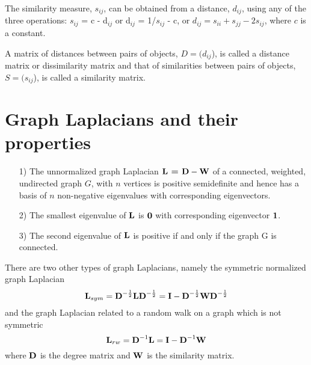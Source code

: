 The similarity measure, $s_{ij}$, can be obtained from a distance, $d_{ij}$, using any of the three operations: $s_{ij}$ = c - d$_{ij}$ or  d$_{ij}$ = 1/$s_{ij}$ - c, or $d_{ij} = s_{ii} + s_{jj} - 2s_{ij}$, where $c$ is a constant.

 
A matrix of distances between pairs of objects, $D = (d_{ij}$), is called a distance matrix or dissimilarity matrix and that of similarities between pairs of objects, $S = (s_{ij}$), is called a similarity matrix.


\section{Graph Laplacians and their properties} \label{graph laplacians}
\begin{itemize}
\item[1)] The unnormalized graph Laplacian $\textbf{L = D} - \textbf{W}$  of a connected, weighted,
undirected graph $G$, with $n$ vertices is positive semidefinite and hence 
has a basis of $n$ non-negative eigenvalues with corresponding  eigenvectors.
\item[2)] The smallest eigenvalue of $\textbf{L}$ is $\boldsymbol{0}$ with corresponding eigenvector $\boldsymbol{1}$. 
\item[3)]The second eigenvalue of $\textbf{L}$ is positive if and only if the graph G is connected.
\end{itemize}


There are two other types of graph Laplacians, namely the symmetric normalized
graph Laplacian 
\begin{equation}\label{normalizedLaplacian}
\textbf{L}_{sym} = \textbf{D}^{-\frac{1}{2}} \textbf{L} \textbf{D}^{-\frac{1}{2}} =
\textbf{I} - \textbf{D}^{-\frac{1}{2}} \textbf{W} \textbf{D}^{-\frac{1}{2}}
\end{equation}
and 
the graph Laplacian related to a random walk on a graph which is not symmetric
\begin{equation}\label{RandomWalk}
\textbf{L}_{rw} = \textbf{D}^{-1}\textbf{L} = \textbf{I} - \textbf{D}^{-1}\textbf{W}
\end{equation}
where $\textbf{D}$ is the degree matrix and $\textbf{W}$ is the similarity matrix.


